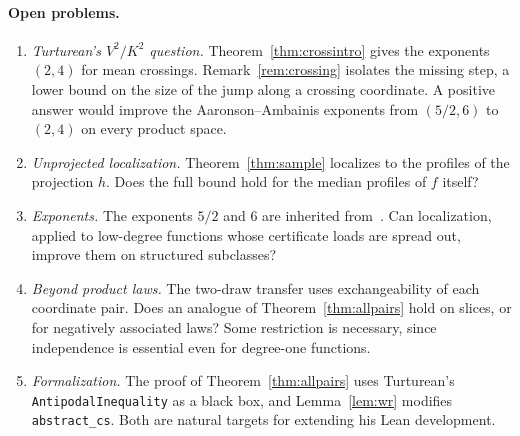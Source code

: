 \documentclass[11pt]{article}
\numberwithin{equation}{section}
\theoremstyle{definition}
\theoremstyle{remark}
\newcommand{\1}{\mathbf 1}
\begin{document}
\paragraph{Open problems.}
\begin{enumerate}[leftmargin=*,itemsep=1pt]
\item \emph{Turturean's $V^2/K^2$ question.} Theorem~\ref{thm:crossintro} gives the exponents $(2,4)$ for mean crossings. Remark~\ref{rem:crossing} isolates the missing step, a lower bound on the size of the jump along a crossing coordinate. A positive answer would improve the Aaronson--Ambainis exponents from $(5/2,6)$ to $(2,4)$ on every product space.
\item \emph{Unprojected localization.} Theorem~\ref{thm:sample} localizes to the profiles of the projection $h$. Does the full bound hold for the median profiles of $f$ itself?
\item \emph{Exponents.} The exponents $5/2$ and $6$ are inherited from~\cite{Tur26}. Can localization, applied to low-degree functions whose certificate loads are spread out, improve them on structured subclasses?
\item \emph{Beyond product laws.} The two-draw transfer uses exchangeability of each coordinate pair. Does an analogue of Theorem~\ref{thm:allpairs} hold on slices, or for negatively associated laws? Some restriction is necessary, since independence is essential even for degree-one functions.
\item \emph{Formalization.} The proof of Theorem~\ref{thm:allpairs} uses Turturean's \texttt{AntipodalInequality} as a black box, and Lemma~\ref{lem:wr} modifies \texttt{abstract\_cs}. Both are natural targets for extending his Lean development.
\end{enumerate}
\end{document}
